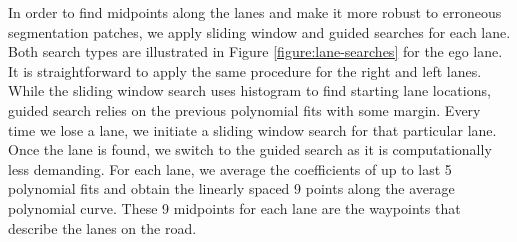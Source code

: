 In order to find midpoints along the lanes and make it more robust to erroneous
segmentation patches, we apply sliding window and guided searches for each
lane. Both search types are illustrated in Figure \ref{figure:lane-searches}
for the ego lane. It is straightforward to apply the same procedure for the
right and left lanes. While the sliding window search uses histogram to find
starting lane locations, guided search relies on the previous polynomial fits
with some margin. Every time we lose a lane, we initiate a sliding window
search for that particular lane. Once the lane is found, we switch to the
guided search as it is computationally less demanding. For each lane, we
average the coefficients of up to last 5 polynomial fits and obtain the
linearly spaced 9 points along the average polynomial curve. These 9 midpoints
for each lane are the waypoints that describe the lanes on the road.

